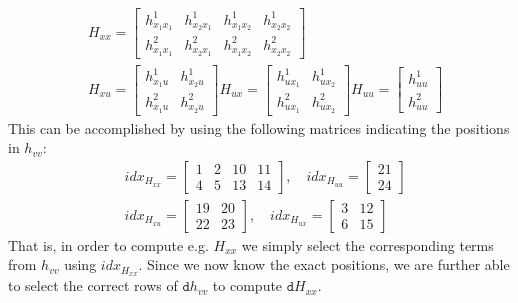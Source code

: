 \documentclass{article}
\begin{document}
\begin{eqnarray*}
  &H_{xx} = \begin{bmatrix} h^1_{x_1x_1} & h^1_{x_2x_1} & h^1_{x_1 x_2} & h^1_{x_2 x_2}\\
                           h^2_{x_1x_1} & h^2_{x_2x_1} & h^2_{x_1 x_2} & h^2_{x_2 x_2}
  \end{bmatrix}\\
   & H_{xu} = \begin{bmatrix} h^1_{x_1 u} & h^1_{x_2 u} \\
                             h^2_{x_1 u} & h^2_{x_2 u}
  \end{bmatrix}
    H_{ux} = \begin{bmatrix} h^1_{u x_1} & h^1_{u x_2} \\
                             h^2_{u x_1} & h^2_{u x_2}
  \end{bmatrix}
    H_{uu} = \begin{bmatrix} h^1_{u u} \\ h^2_{u u} \end{bmatrix}
\end{eqnarray*}
This can be accomplished by using the following matrices indicating the positions in $h_{vv}$:
\begin{eqnarray*}
  &idx_{H_{xx}} = \begin{bmatrix} 1 & 2 & 10 & 11\\
                            4 & 5 & 13 & 14
  \end{bmatrix}, \quad idx_{H_{uu}} = \begin{bmatrix} 21 \\ 24 \end{bmatrix} \\
   & idx_{H_{xu}} = \begin{bmatrix} 19 & 20 \\
                              22 & 23
  \end{bmatrix},\quad
    idx_{H_{ux}} = \begin{bmatrix} 3 & 12 \\
                             6 & 15
  \end{bmatrix}
\end{eqnarray*}
That is, in order to compute e.g. $H_{xx}$ we simply select the corresponding terms from $h_{vv}$ using $idx_{H_{xx}}$. Since we now know the exact positions, we are further able to select the correct rows of $\texttt{d}h_{vv}$ to compute $\texttt{d}H_{xx}$.
\end{document}
